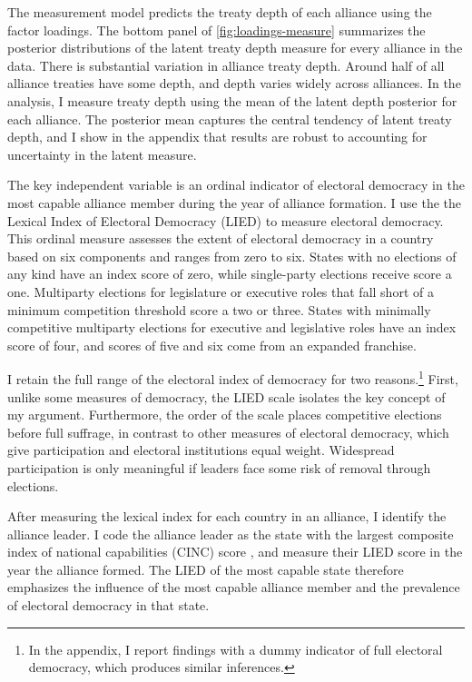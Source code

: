 \documentclass[12pt]{article}
\begin{document}
The measurement model predicts the treaty depth of each alliance using the factor loadings. 
The bottom panel of \autoref{fig:loadings-measure} summarizes the posterior distributions of the latent treaty depth measure for every alliance in the data. 
There is substantial variation in alliance treaty depth. 
Around half of all alliance treaties have some depth, and depth varies widely across alliances.
In the analysis, I measure treaty depth using the mean of the latent depth posterior for each alliance. 
The posterior mean captures the central tendency of latent treaty depth, and I show in the appendix that results are robust to accounting for uncertainty in the latent measure. 


The key independent variable is an ordinal indicator of electoral democracy in the most capable alliance member during the year of alliance formation. 
I use the the Lexical Index of Electoral Democracy (LIED) \citep{Skaaningetal2015} to measure electoral democracy.
This ordinal measure assesses the extent of electoral democracy in a country based on six components and ranges from zero to six.  
States with no elections of any kind have an index score of zero, while single-party elections receive score a one. 
Multiparty elections for legislature or executive roles that fall short of a minimum competition threshold score a two or three. 
States with minimally competitive multiparty elections for executive and legislative roles have an index score of four, and scores of five and six come from an expanded franchise.

I retain the full range of the electoral index of democracy for two reasons.\footnote{In the appendix, I report findings with a dummy indicator of full electoral democracy, which produces similar inferences.}
First, unlike some measures of democracy, the LIED scale isolates the key concept of my argument.
Furthermore, the order of the scale places competitive elections before full suffrage, in contrast to other measures of electoral democracy, which give participation and electoral institutions equal weight. 
Widespread participation is only meaningful if leaders face some risk of removal through elections.


After measuring the lexical index for each country in an alliance, I identify the alliance leader.   
I code the alliance leader as the state with the largest composite index of national capabilities (CINC) score \citep{SingerCINC1988}, and measure their LIED score in the year the alliance formed.
The LIED of the most capable state therefore emphasizes the influence of the most capable alliance member and the prevalence of electoral democracy in that state.
\end{document}
